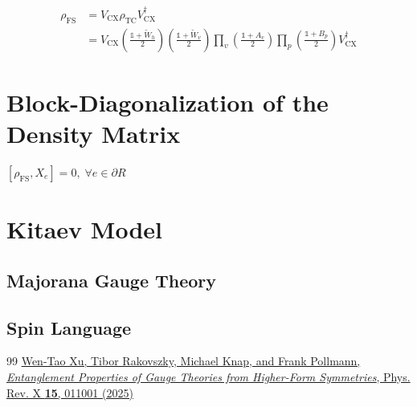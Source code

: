\documentclass[12font]{article}
\theoremstyle{definition}
\numberwithin{equation}{section}
\newcommand{\lr}[1]{\left(  #1  \right)}
\newcommand{\de}{\partial}
\newcommand{\mrm}[1]{\mathrm{#1}}
\begin{document}
\begin{align*}
  \rho_{\mrm{FS}} 
  &= V_{\mrm{CX}}\rho_{\mrm{TC}}V^\dagger_{\mrm{CX}} \\
  &= V_{\mrm{CX}}\lr{\frac{\mathds{1}+\tilde{W}_h}{2}} \lr{\frac{\mathds{1}+\tilde{W}_v}{2}} \prod_{v}\lr{\frac{\mathds{1}+A_v}{2}} \prod_{p}\lr{\frac{\mathds{1}+B_p}{2}} V^\dagger_{\mrm{CX}} 
\end{align*}

\section{Block-Diagonalization of the Density Matrix}
$[\rho_{\mrm{FS}},X_e]=0,\;\forall e\in\de R$

\section{Kitaev Model}
\subsection{Majorana Gauge Theory}
\subsection{Spin Language}

\begin{thebibliography}{99}
    \href{https://journals.aps.org/prx/abstract/10.1103/PhysRevX.15.011001}{Wen-Tao Xu, Tibor Rakovszky, Michael Knap, and Frank Pollmann, \emph{Entanglement Properties of Gauge Theories from Higher-Form Symmetries}, Phys. Rev. X \textbf{15}, 011001 (2025)}
\end{thebibliography}
\end{document}
